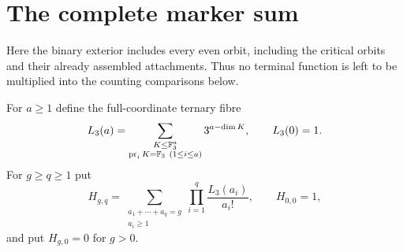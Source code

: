 \section{The complete marker sum}\label{sec:marker-complete}
Here the binary exterior includes every even orbit, including the critical
orbits and their already assembled attachments. Thus no terminal function
is left to be multiplied into the counting comparisons below.

For $a\geq1$ define the full-coordinate ternary fibre
\[
 L_3(a)=\sum_{\substack{K\leq\mathbb F_3^a\\
                 \operatorname{pr}_iK=\mathbb F_3\ (1\leq i\leq a)}}
                3^{a-\dim K},\qquad L_3(0)=1.
\]
For $g\geq q\geq1$ put
\[
 H_{g,q}=\sum_{\substack{a_1+\cdots+a_q=g\\a_i\geq1}}
                   \prod_{i=1}^q\frac{L_3(a_i)}{a_i!},
 \qquad H_{0,0}=1,
\]
and put $H_{g,0}=0$ for $g>0$.

